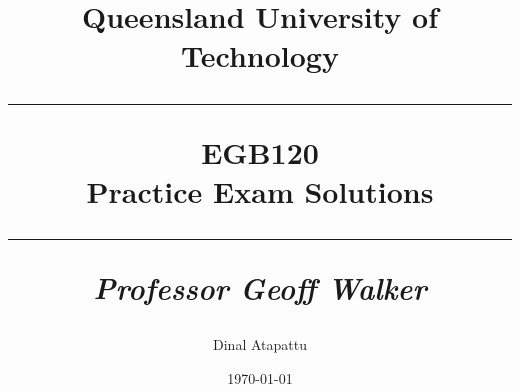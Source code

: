 \documentclass[oneside]{book}
\begin{document}
\pagestyle{fancy}
    \fancyhf{}
\fancyhead[R]{\nouppercase{\leftmark}}
\renewcommand{\footrulewidth}{0.4pt}
    \title{
            Queensland University of Technology\\
            \rule{\linewidth}{0.5pt}
        \centering
        \textbf{EGB120} \\
        Practice Exam Solutions\\
        \vspace{0.4cm}
        \rule{\linewidth}{1.5pt}
        \small{\textit{Professor Geoff Walker}}
    }
    \author{Dinal Atapattu}
    \date{\today}
    \maketitle
    \thispagestyle{empty}
    \tableofcontents
    
    
    
    
\end{document}
